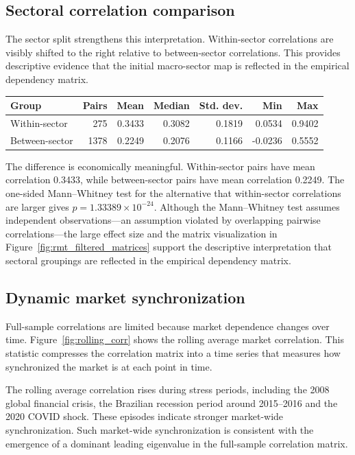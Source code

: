 \subsection{Sectoral correlation comparison}

The sector split strengthens this interpretation. Within-sector correlations are visibly shifted to the right relative to between-sector correlations. This provides descriptive evidence that the initial macro-sector map is reflected in the empirical dependency matrix.

\begin{center}
\label{tab:sector_corr_summary}
\begin{tabular}{lrrrrrr}
\toprule
Group & Pairs & Mean & Median & Std. dev. & Min & Max \\
\midrule
Within-sector & 275 & 0.3433 & 0.3082 & 0.1819 & 0.0534 & 0.9402 \\
Between-sector & 1378 & 0.2249 & 0.2076 & 0.1166 & -0.0236 & 0.5552 \\
\bottomrule
\end{tabular}
\end{center}

The difference is economically meaningful. Within-sector pairs have mean correlation 0.3433, while between-sector pairs have mean correlation 0.2249. The one-sided Mann--Whitney test for the alternative that within-sector correlations are larger gives $p=1.33389\times10^{-24}$. Although the Mann--Whitney test assumes independent observations---an assumption violated by overlapping pairwise correlations---the large effect size and the matrix visualization in Figure~\ref{fig:rmt_filtered_matrices} support the descriptive interpretation that sectoral groupings are reflected in the empirical dependency matrix.

\subsection{Dynamic market synchronization}

Full-sample correlations are limited because market dependence changes over time. Figure~\ref{fig:rolling_corr} shows the rolling average market correlation. This statistic compresses the correlation matrix into a time series that measures how synchronized the market is at each point in time.

The rolling average correlation rises during stress periods, including the 2008 global financial crisis, the Brazilian recession period around 2015--2016 and the 2020 COVID shock. These episodes indicate stronger market-wide synchronization. Such market-wide synchronization is consistent with the emergence of a dominant leading eigenvalue in the full-sample correlation matrix.

